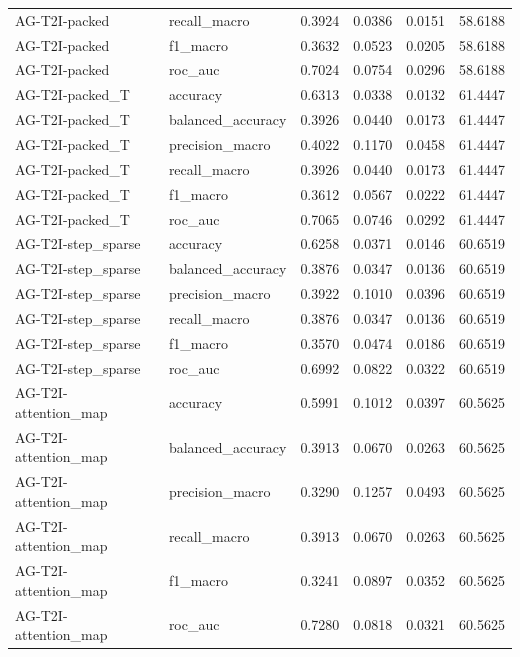 \begin{tabular}{llrrrr}
AG-T2I-packed & recall_macro & 0.3924 & 0.0386 & 0.0151 & 58.6188 \\
AG-T2I-packed & f1_macro & 0.3632 & 0.0523 & 0.0205 & 58.6188 \\
AG-T2I-packed & roc_auc & 0.7024 & 0.0754 & 0.0296 & 58.6188 \\
AG-T2I-packed_T & accuracy & 0.6313 & 0.0338 & 0.0132 & 61.4447 \\
AG-T2I-packed_T & balanced_accuracy & 0.3926 & 0.0440 & 0.0173 & 61.4447 \\
AG-T2I-packed_T & precision_macro & 0.4022 & 0.1170 & 0.0458 & 61.4447 \\
AG-T2I-packed_T & recall_macro & 0.3926 & 0.0440 & 0.0173 & 61.4447 \\
AG-T2I-packed_T & f1_macro & 0.3612 & 0.0567 & 0.0222 & 61.4447 \\
AG-T2I-packed_T & roc_auc & 0.7065 & 0.0746 & 0.0292 & 61.4447 \\
AG-T2I-step_sparse & accuracy & 0.6258 & 0.0371 & 0.0146 & 60.6519 \\
AG-T2I-step_sparse & balanced_accuracy & 0.3876 & 0.0347 & 0.0136 & 60.6519 \\
AG-T2I-step_sparse & precision_macro & 0.3922 & 0.1010 & 0.0396 & 60.6519 \\
AG-T2I-step_sparse & recall_macro & 0.3876 & 0.0347 & 0.0136 & 60.6519 \\
AG-T2I-step_sparse & f1_macro & 0.3570 & 0.0474 & 0.0186 & 60.6519 \\
AG-T2I-step_sparse & roc_auc & 0.6992 & 0.0822 & 0.0322 & 60.6519 \\
AG-T2I-attention_map & accuracy & 0.5991 & 0.1012 & 0.0397 & 60.5625 \\
AG-T2I-attention_map & balanced_accuracy & 0.3913 & 0.0670 & 0.0263 & 60.5625 \\
AG-T2I-attention_map & precision_macro & 0.3290 & 0.1257 & 0.0493 & 60.5625 \\
AG-T2I-attention_map & recall_macro & 0.3913 & 0.0670 & 0.0263 & 60.5625 \\
AG-T2I-attention_map & f1_macro & 0.3241 & 0.0897 & 0.0352 & 60.5625 \\
AG-T2I-attention_map & roc_auc & 0.7280 & 0.0818 & 0.0321 & 60.5625 \\
\bottomrule
\end{tabular}
